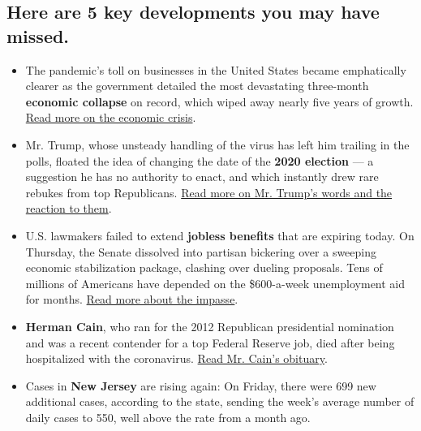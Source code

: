 \subsection{}

\hypertarget{here-are-5-key-developments-you-may-have-missed}{%
\subsection{Here are 5 key developments you may have
missed.}\label{here-are-5-key-developments-you-may-have-missed}}

\begin{itemize}
\item
  The pandemic's toll on businesses in the United States became
  emphatically clearer as the government detailed the most devastating
  three-month \textbf{economic collapse} on record, which wiped away
  nearly five years of growth.
  \href{https://www.nytimes.com/2020/07/30/business/economy/q2-gdp-coronavirus-economy.html}{Read
  more on the economic crisis}.
\item
  Mr. Trump, whose unsteady handling of the virus has left him trailing
  in the polls, floated the idea of changing the date of the
  \textbf{2020 election} --- a suggestion he has no authority to enact,
  and which instantly drew rare rebukes from top Republicans.
  \href{https://www.nytimes.com/2020/07/30/us/politics/trump-delay-2020-election.html?action=click\&module=Top\%20Stories\&pgtype=Homepage}{Read
  more on Mr. Trump's words and the reaction to them}.
\item
  U.S. lawmakers failed to extend \textbf{jobless benefits} that are
  expiring today. On Thursday, the Senate dissolved into partisan
  bickering over a sweeping economic stabilization package, clashing
  over dueling proposals. Tens of millions of Americans have depended on
  the \$600-a-week unemployment aid for months.
  \href{https://www.nytimes.com/2020/07/30/us/politics/senate-virus-aid.html}{Read
  more about the impasse}.
\item
  \textbf{Herman Cain}, who ran for the 2012 Republican presidential
  nomination and was a recent contender for a top Federal Reserve job,
  died after being hospitalized with the coronavirus.
  \href{https://www.nytimes.com/2020/07/30/us/politics/herman-cain-dead.html}{Read
  Mr. Cain's obituary}.
\item
  Cases in \textbf{New Jersey} are rising again: On Friday, there were
  699 new additional cases, according to the state, sending the week's
  average number of daily cases to 550, well above the rate from a month
  ago.


\end{itemize}
